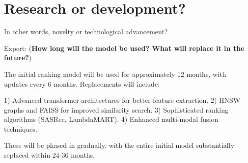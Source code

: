 \documentclass[12pt]{article}
\begin{document}
\section{Research or development?}
In other words, novelty or technological advancement?

{Expert:} (\textbf{How long will the model be used? What will replace it in the future?})

The initial ranking model will be used for approximately 12 months, with updates every 6 months. Replacements will include:

1) Advanced transformer architectures for better feature extraction.
2) HNSW graphs and FAISS for improved similarity search.
3) Sophisticated ranking algorithms (SASRec, LambdaMART).
4) Enhanced multi-modal fusion techniques.

These will be phased in gradually, with the entire initial model substantially replaced within 24-36 months.
\end{document}
